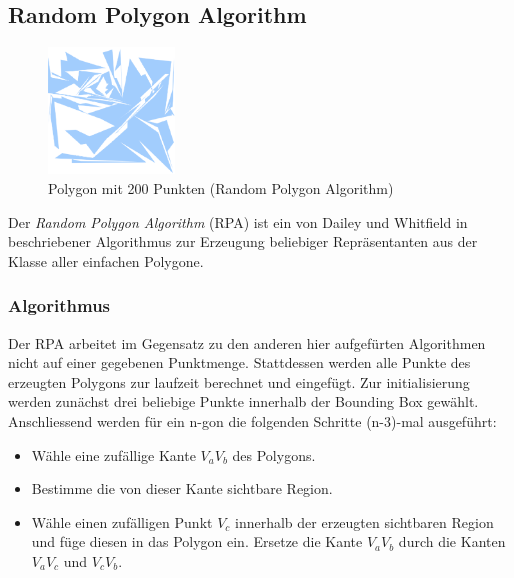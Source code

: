 \subsection{Random Polygon Algorithm} %

\begin{figure}[h]
\begin{center}
\includegraphics[width=0.3\textwidth]{img/rpa200.eps}
\end{center}
\caption{Polygon mit 200 Punkten (Random Polygon Algorithm)}
\label{fig:virmani200}
\end{figure}

\label{sub:random_polygon_algorithm}

  Der \textit{Random Polygon Algorithm} (RPA) ist ein von Dailey und
  Whitfield in~\cite{dailey08rpa} beschriebener Algorithmus zur Erzeugung
  beliebiger Repräsentanten aus der Klasse aller einfachen Polygone.

  \subsubsection{Algorithmus} %
  \label{ssub:algorithmus}

    Der RPA arbeitet im Gegensatz zu den anderen hier aufgefürten
    Algorithmen nicht auf einer gegebenen Punktmenge. Stattdessen werden
    alle Punkte des erzeugten Polygons zur laufzeit berechnet und
    eingefügt. Zur initialisierung werden zunächst drei beliebige Punkte
    innerhalb der Bounding Box gewählt. Anschliessend werden für ein n-gon
    die folgenden Schritte (n-3)-mal ausgeführt:

    \begin{itemize}
      \item Wähle eine zufällige Kante $V_aV_b$ des Polygons.
      \item Bestimme die von dieser Kante sichtbare Region.
      \item Wähle einen zufälligen Punkt $V_c$ innerhalb der 
            erzeugten sichtbaren Region und füge diesen in das 
            Polygon ein. Ersetze die Kante $V_aV_b$ durch die Kanten 
            $V_aV_c$ und $V_cV_b$.
    \end{itemize}


